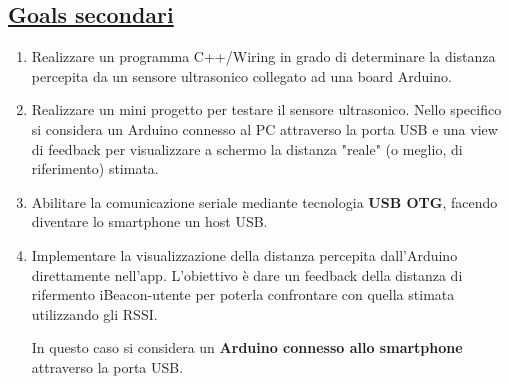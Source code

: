 \subsection{\underline{Goals secondari}}
\begin{enumerate}	
	\item Realizzare un programma C++/Wiring in grado di determinare la distanza percepita da un sensore ultrasonico collegato ad una board Arduino.
	
	\item Realizzare un mini progetto per testare il sensore ultrasonico. Nello specifico si considera un Arduino connesso al PC attraverso la porta USB e una view di feedback per visualizzare a schermo la distanza "reale" (o meglio, di riferimento) stimata.
	
	\item Abilitare la comunicazione seriale mediante tecnologia \textbf{USB OTG}, facendo diventare lo smartphone un host USB.
	
	\item Implementare la visualizzazione della distanza percepita dall'Arduino direttamente nell'app. L'obiettivo è dare un feedback della distanza di rifermento iBeacon-utente per poterla confrontare con quella stimata utilizzando gli RSSI. 
	
	In questo caso si considera un \textbf{Arduino connesso allo smartphone} attraverso la porta USB.
\end{enumerate}



